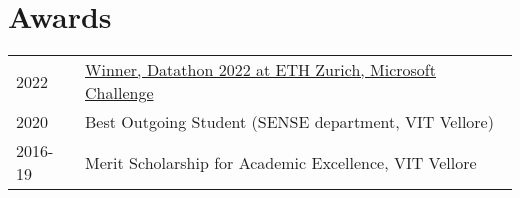 \documentclass[]{onepage}
\begin{document}
\begin{minipage}[t]{0.66\textwidth}
\vspace{-0.1cm}
\section{Awards} 
\begin{tabular}{ll}
2022         & \href{https://github.com/FatjonZOGAJ/multilingual-text-analytics}{Winner, Datathon 2022 at ETH Zurich, Microsoft Challenge}\\
2020	     &  Best Outgoing Student (SENSE department, VIT Vellore)\\
2016-19      & Merit Scholarship for Academic Excellence, VIT Vellore
\end{tabular}
\sectionsep

\end{minipage} 
\end{document}
